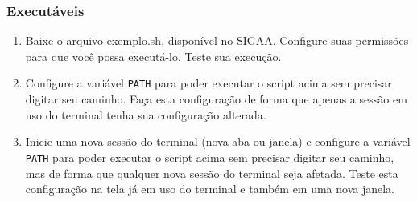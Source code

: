 \documentclass[a4paper,10pt,titlepage,twosided]{book}
\begin{document}
\subsubsection{Executáveis}

\begin{enumerate}
\item Baixe o arquivo \textsf{exemplo.sh}, disponível no SIGAA. Configure suas permissões para que você possa executá-lo. Teste sua execução.
\item Configure a variável \texttt{PATH} para poder executar o script acima sem precisar digitar seu caminho. Faça esta configuração de forma que apenas a sessão em uso do terminal tenha sua configuração alterada.
\item Inicie uma nova sessão do terminal (nova aba ou janela) e configure a variável \texttt{PATH} para poder executar o script acima sem precisar digitar seu caminho, mas de forma que qualquer nova sessão do terminal seja afetada. Teste esta configuração na tela já em uso do terminal e também em uma nova janela.
\end{enumerate}
\end{document}
